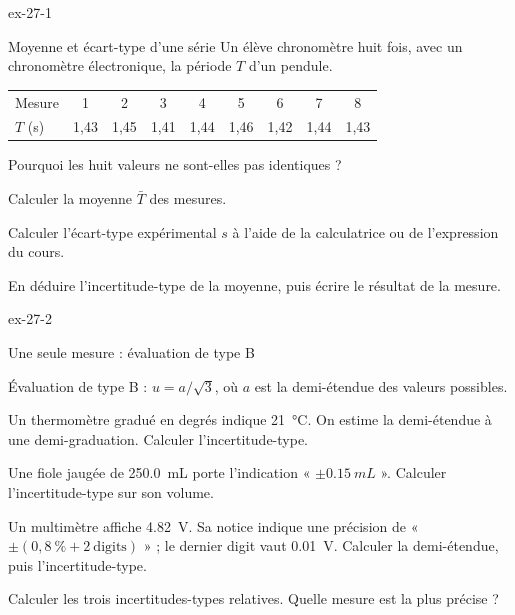 \begin{blocLivre}{ex-27-1}
\begin{exercice}[1]{Moyenne et écart-type d'une série}
Un élève chronomètre huit fois, avec un chronomètre électronique, la période $T$ d'un pendule.
\begin{center}
\begin{tabular}{lcccccccc}
\toprule
Mesure & 1 & 2 & 3 & 4 & 5 & 6 & 7 & 8 \\
$T$ (s) & 1,43 & 1,45 & 1,41 & 1,44 & 1,46 & 1,42 & 1,44 & 1,43 \\
\bottomrule
\end{tabular}
\end{center}
\begin{questions}
\item Pourquoi les huit valeurs ne sont-elles pas identiques ?
\item Calculer la moyenne $\bar T$ des mesures.
\item Calculer l'écart-type expérimental $s$ à l'aide de la calculatrice ou de l'expression du cours.
\item En déduire l'incertitude-type de la moyenne, puis écrire le résultat de la mesure.
\end{questions}
\end{exercice}
\end{blocLivre}
\begin{blocLivre}{ex-27-2}
\begin{exercice}[1]{Une seule mesure : évaluation de type B}
\begin{donnees}
Évaluation de type B : $u=a/\sqrt3$, où $a$ est la demi-étendue des valeurs possibles.
\end{donnees}
\begin{questions}
\item Un thermomètre gradué en degrés indique \qty{21}{\degreeCelsius}. On estime la demi-étendue à une demi-graduation. Calculer
l'incertitude-type.
\item Une fiole jaugée de \qty{250,0}{mL} porte l'indication « $\pm\qty{0,15}{mL}$ ». Calculer l'incertitude-type sur son volume.
\item Un multimètre affiche \qty{4,82}{V}. Sa notice indique une précision de « $\pm(0{,}8~\%+2~\text{digits})$ » ; le dernier digit vaut
\qty{0,01}{V}. Calculer la demi-étendue, puis l'incertitude-type.
\item Calculer les trois incertitudes-types relatives. Quelle mesure est la plus précise ?
\end{questions}
\end{exercice}
\end{blocLivre}
